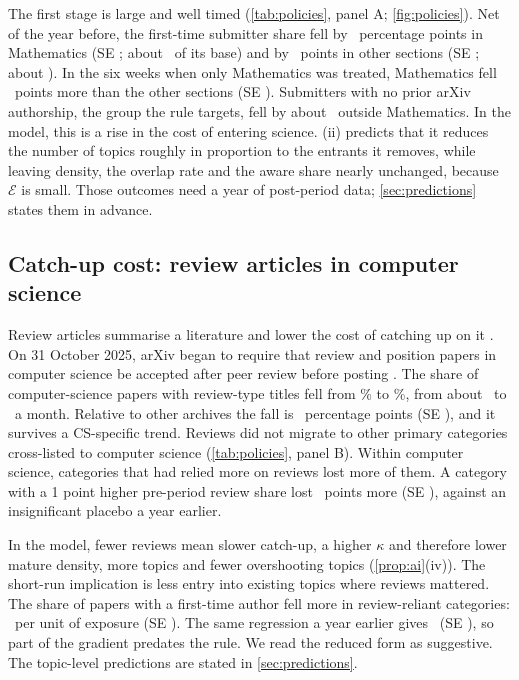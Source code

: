 The first stage is large and well timed (\cref{tab:policies}, panel A;
\cref{fig:policies}). Net of the year before, the first-time submitter share fell by
\empEndMath\ percentage points in Mathematics (SE \empEndMathSE; about
\empEndMathRel\ of its base) and by \empEndOther\ points in other sections (SE
\empEndOtherSE; about \empEndOtherRel). In the six weeks when only Mathematics was
treated, Mathematics fell \empEndStag\ points more than the other sections (SE
\empEndStagSE). Submitters with no prior arXiv authorship, the group the rule
targets, fell by about \empEndNoTrackOtherRel\ outside Mathematics. In the model,
this is a rise in the cost of entering science. (ii) predicts that
it reduces the number of topics roughly in proportion to the entrants it
removes, while leaving density, the overlap rate and the aware share nearly
unchanged, because $\mathcal E$ is small. Those outcomes need a year of
post-period data; \cref{sec:predictions} states them in advance.

\subsection{Catch-up cost: review articles in computer science}

Review articles summarise a literature and lower the cost of catching up on it
\citep{mcmahanmcfarland2021}. On 31 October 2025, arXiv began to require that
review and position papers in computer science be accepted after peer review
before posting \citep{arxivcsreview2025}. The share of computer-science papers
with review-type titles fell from \empCSpre\% to \empCSpost\%, from about
\empCSperMonthPre\ to \empCSperMonthPost\ a month. Relative to other archives the
fall is \empCSdid\ percentage points (SE \empCSdidSE), and it survives a CS-specific trend.
Reviews did not migrate to other primary categories cross-listed to computer
science (\cref{tab:policies}, panel B). Within computer science, categories that
had relied more on reviews lost more of them. A category with a 1 point higher
pre-period review share lost \empCSdoseFS\ points more (SE \empCSdoseFSSE),
against an insignificant placebo a year earlier.

In the model, fewer reviews mean slower catch-up, a higher $\kappa$ and
therefore lower mature density, more topics and fewer overshooting topics
(\cref{prop:ai}(iv)). The short-run implication is less entry into existing
topics where reviews mattered. The share of papers with a first-time author fell
more in review-reliant categories: \empCSdoseRF\ per unit of exposure (SE
\empCSdoseRFSE). The same regression a year earlier gives \empCSdoseRFpl\ (SE
\empCSdoseRFplSE), so part of the gradient predates the rule. We read the reduced
form as suggestive. The topic-level predictions are stated in
\cref{sec:predictions}.

